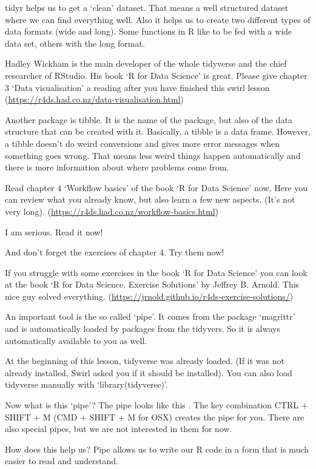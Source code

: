 tidyr helps us to get a ‘clean’ dataset. That means a well structured dataset where we can find everything well. Also it helps us to create two different types of data formats (wide and long). Some functions in R like to be fed with a wide data set, others with the long format.

Hadley Wickham is the main developer of the whole tidyverse and the chief researcher of RStudio. His book ‘R for Data Science’ is great. Please give chapter 3 ‘Data visualisation’ a reading after you have finished this swirl lesson (\url{https://r4ds.had.co.nz/data-visualisation.html})

Another package is tibble. It is the name of the package, but also of the data structure that can be created with it. Basically, a tibble is a data frame. However, a tibble doesn’t do weird conversions and gives more error messages when something goes wrong. That means less weird things happen automatically and there is more information about where problems come from.

Read chapter 4 ‘Workflow basics’ of the book ‘R for Data Science’ now. Here you can review what you already know, but also learn a few new aspects. (It’s not very long). (\url{https://r4ds.had.co.nz/workflow-basics.html})

I am serious. Read it now!

And don’t forget the exercises of chapter 4. Try them now!

If you struggle with some exercises in the book ‘R for Data Science’ you can look at the book ‘R for Data Science. Exercise Solutions’ by Jeffrey B. Arnold. This nice guy solved everything. (\url{https://jrnold.github.io/r4ds-exercise-solutions/})

An important tool is the so called ‘pipe’. It comes from the package ‘magrittr’ and is automatically loaded by packages from the tidyvers. So it is always automatically available to you as well.

At the beginning of this lesson, tidyverse was already loaded. (If it was not already installed, Swirl asked you if it should be installed). You can also load tidyverse manually with ‘library(tidyverse)’.

Now what is this ‘pipe’? The pipe looks like this \rtext{\%>\%}.
The key combination CTRL + SHIFT + M (CMD + SHIFT + M for OSX) creates the pipe for you. There are also special pipes, but we are not interested in them for now.

How does this help us? Pipe allows us to write our R code in a form that is much easier to read and understand.

